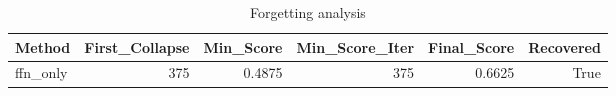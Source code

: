 \begin{table}[htbp]
\centering
\caption{Forgetting analysis}
\label{tab:forgetting}
\begin{tabular}{lrrrrr}
\toprule
\textbf{Method} & \textbf{First\_Collapse} & \textbf{Min\_Score} & \textbf{Min\_Score\_Iter} & \textbf{Final\_Score} & \textbf{Recovered} \\
\midrule
ffn\_only & 375 & 0.4875 & 375 & 0.6625 & True \\
\bottomrule
\end{tabular}
\end{table}